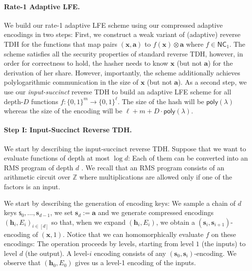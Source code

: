\documentclass{article}
\newcommand{\Z}{\mathbb{Z}}
\newcommand{\poly}{\mathsf{poly}}
\renewcommand{\sec}{\ensuremath{\lambda}}
\begin{document}
\paragraph{Rate-1 Adaptive LFE.} We build our rate-1 adaptive LFE scheme using our compressed adaptive encodings in two steps: First, we construct a weak variant of (adaptive) reverse TDH for the functions that map pairs $(\mathbf{x}, \mathbf{a})$ to $f(\mathbf{x})\otimes \mathbf{a}$ where $f\in\mathsf{NC}_1$. The scheme satisfies all the security properties of standard reverse TDH, however, in order for correctness to hold, the hasher needs to know $\mathbf{x}$ (but not $\mathbf{a}$) for the derivation of her share. {However, importantly, the scheme additionally achieves} polylogarithmic communication in the size of $\mathbf{x}$ (but not $\mathbf{a}$). As a second step, we use our \emph{input-succinct} reverse TDH to build an adaptive LFE scheme for all depth-$D$ functions $f:\{0, 1\}^m\rightarrow \{0, 1\}^\ell$. The size of the hash will be $\poly(\sec)$ whereas the size of the encoding will be $\ell+m+D\cdot \poly(\sec)$.

\paragraph{Step I: Input-Succinct Reverse TDH.} We start by describing the input-succinct reverse TDH. Suppose that we want to evaluate functions of depth at most $\log d$: Each of them can be converted into an RMS program of depth $d$ \cite{C:BoyGilIsh16}. We recall that an RMS program consists of an arithmetic circuit over $\Z$ where multiplications are allowed only if one of the factors is an input. 

We start by describing the generation of encoding keys: We sample a chain of $d$ keys $\mathsf{s}_0, \dots, \mathbf{s}_{d-1}$, we set $\mathbf{s}_d:=\mathbf{a}$ and we generate compressed encodings $(\mathbf{h}_i, E_i)_{i\in[d]}$ so that, when we expand $(\mathbf{h}_i, E_i)$, we obtain a $(\mathbf{s}_i, \mathbf{s}_{i+1})$-encoding of $(\mathbf{x}, 1)$. Notice that we can homomorphically evaluate $f$ on these encodings: The operation proceeds by levels, starting from level $1$ (the inputs) to level $d$ (the output). A level-$i$ encoding consists of any $(\mathbf{s}_0, \mathbf{s}_i)$-encoding. We observe that $(\mathbf{h}_0, E_0)$ gives us a level-1 encoding of the inputs.
\end{document}
